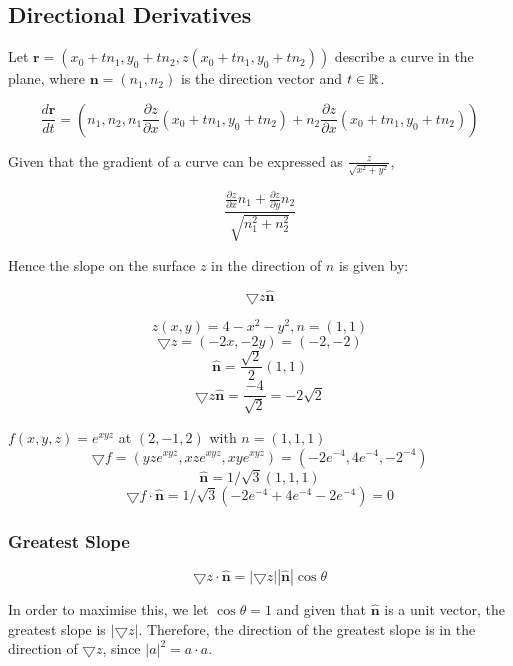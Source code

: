 \documentclass[a4paper,10pt]{article}
\begin{document}
\subsection{Directional Derivatives}

Let $\mathbf{r} = \left(x_0 + tn_1, y_0 + tn_2, z(x_0 + tn_1, y_0 +
tn_2)\right)$ describe a curve in the plane, where $\mathbf{n} = (n_1, n_2)$ is
the direction vector and $t \in \mathbb{R}$.

\[ \frac{d\mathbf{r}}{dt} = \left(n_1, n_2, n_1 \frac{\partial z}{\partial x}
(x_0 + tn_1, y_0 + tn_2) + n_2 \frac{\partial z}{\partial x} (x_0 + tn_1, y_0 +
tn_2)\right) \]

Given that the gradient of a curve can be expressed as $\frac{z}{\sqrt{x^2 +
y^2}}$,

\[ \frac{\frac{\partial z}{\partial x} n_1 + \frac{\partial z}{\partial y}
n_2}{\sqrt{n_1^2 + n_2^2}} \]

Hence the slope on the surface $z$ in the direction of $n$ is given by:

\[ \bigtriangledown z \mathbf{\hat{n}} \]

\begin{ex}
	\[ z(x,y) = 4 - x^2 - y^2, n = (1,1) \]
	\[ \bigtriangledown z = (-2x, -2y) = (-2, -2) \]
	\[ \mathbf{\hat{n}} = \frac{\sqrt{2}}{2} (1,1) \]
	\[ \bigtriangledown z \mathbf{\hat{n}} = \frac{-4}{\sqrt{2}}
	   = -2 \sqrt{2} \]
\end{ex}

\begin{ex}
	$f(x,y,z) = e^{xyz}$ at $(2,-1,2)$ with $n = (1,1,1)$
	\[ \bigtriangledown f = (yze^{xyz}, xze^{xyz}, xye^{xyz})
		= (-2e^{-4}, 4e^{-4}, -2^{-4}) \]
	\[ \mathbf{\hat{n}} = 1/\sqrt{3}(1,1,1) \]
	\[ \bigtriangledown f \cdot \mathbf{\hat{n}} = 1/\sqrt{3}(-2e^{-4} +
	4e^{-4} - 2e^{-4}) = 0 \]
\end{ex}

\subsubsection{Greatest Slope}

\[ \bigtriangledown z \cdot \mathbf{\hat{n}} = |\bigtriangledown
z||\mathbf{\hat{n}}|\cos \theta \]

In order to maximise this, we let $\cos \theta = 1$ and given that
$\mathbf{\hat{n}}$ is a unit vector, the greatest slope is $|\bigtriangledown
z|$. Therefore, the direction of the greatest slope is in the direction of
$\bigtriangledown z$, since $|a|^2 = a \cdot a$.
\end{document}
